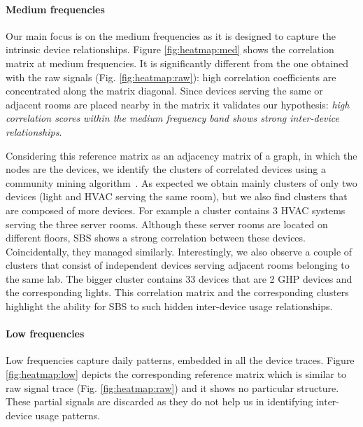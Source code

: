 \paragraph{Medium frequencies}
Our main focus is on the medium frequencies as it is designed to capture the intrinsic device relationships.
Figure \ref{fig:heatmap:med} shows the correlation matrix at medium frequencies.
It is significantly different from the one obtained with the raw signals (Fig. \ref{fig:heatmap:raw}): high correlation coefficients are concentrated along the matrix diagonal. 
Since devices serving the same or adjacent rooms are placed nearby in the matrix it validates our hypothesis: \emph{high correlation scores within the medium frequency band shows strong inter-device relationships}.

Considering this reference matrix as an adjacency matrix of a graph, in which the nodes are the devices, we identify the clusters of 
correlated devices using a community mining algorithm~\cite{blondel:unfolding}.
As expected we obtain mainly clusters of only two devices (light and HVAC serving the same room), but we also find clusters that are composed of more devices.
For example a cluster contains 3 HVAC systems serving the three server rooms. Although these server rooms are located on
 different floors, SBS shows a strong correlation between these devices.  Coincidentally, they managed similarly.
Interestingly, we also observe a couple of clusters that consist of independent devices serving adjacent rooms belonging to the same lab.
The bigger cluster contains 33 devices that are 2 GHP devices and the corresponding lights.
This correlation matrix and the corresponding clusters 
highlight the ability for SBS to such hidden inter-device usage relationships.
 
\paragraph{Low frequencies}
Low frequencies capture daily patterns, embedded in all the device traces.  
Figure \ref{fig:heatmap:low} depicts the corresponding reference matrix which is similar to raw signal trace (Fig. \ref{fig:heatmap:raw}) 
and it shows no particular structure.%
These partial signals are discarded as they do not help us in identifying inter-device usage patterns.
 
